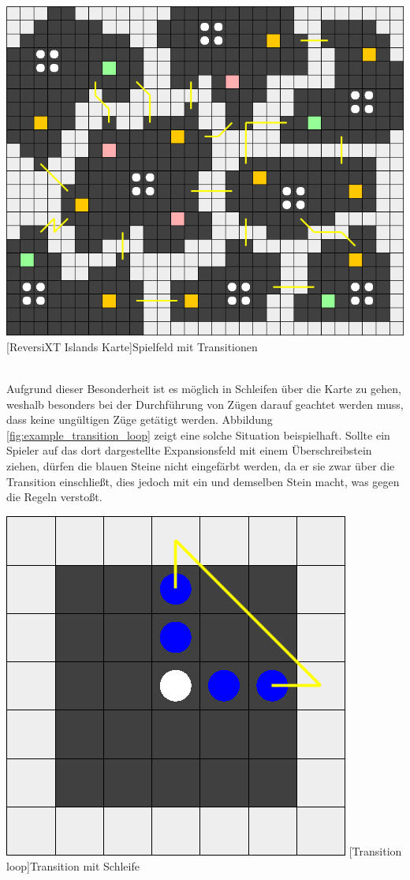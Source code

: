 \documentclass[12pt,a4paper,bibliography=totocnumbered,listof=totocnumbered]{article}
\begin{document}
\vspace{1em}
\begin{minipage}{\linewidth}
	\centering
	\includegraphics[width=0.7\linewidth]{pics/reversixt_islands_map.png}
	[ReversiXT Islands Karte]{Spielfeld mit Transitionen}
	\label{fig:reversixt_islands_map}
\end{minipage}
\\

Aufgrund dieser Besonderheit ist es möglich in Schleifen über die Karte zu gehen, weshalb besonders bei der Durchführung von Zügen darauf geachtet werden muss, dass keine ungültigen Züge getätigt werden. Abbildung \ref{fig:example_transition_loop} zeigt eine solche Situation beispielhaft. Sollte ein Spieler auf das dort dargestellte Expansionsfeld mit einem Überschreibstein ziehen, dürfen die blauen Steine nicht eingefärbt werden, da er sie zwar über die Transition einschließt, dies jedoch mit ein und demselben Stein macht, was gegen die Regeln verstoßt.

\vspace{1em}
\begin{minipage}{\linewidth}
	\centering
	\includegraphics[width=0.4\linewidth]{pics/transition_loop.png}
	[Transition loop]{Transition mit Schleife}
	\label{fig:example_transition_loop}
\end{minipage}
\\
\end{document}
